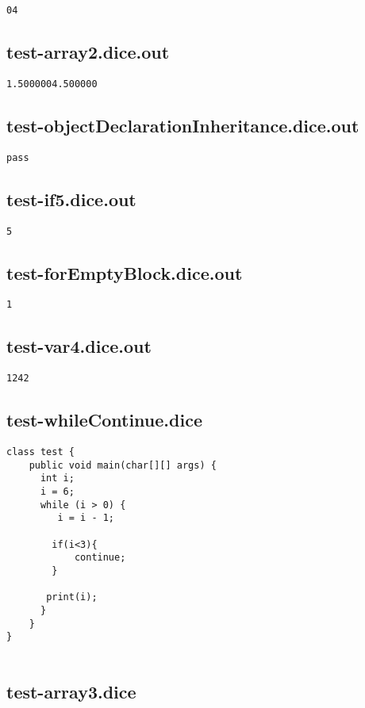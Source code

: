 \begin{verbatim}
04
\end{verbatim}\pagebreak\subsection{test-array2.dice.out}
\begin{verbatim}
1.5000004.500000
\end{verbatim}\pagebreak\subsection{test-objectDeclarationInheritance.dice.out}
\begin{verbatim}
pass
\end{verbatim}\pagebreak\subsection{test-if5.dice.out}
\begin{verbatim}
5
\end{verbatim}\pagebreak\subsection{test-forEmptyBlock.dice.out}
\begin{verbatim}
1
\end{verbatim}\pagebreak\subsection{test-var4.dice.out}
\begin{verbatim}
1242
\end{verbatim}\pagebreak\subsection{test-whileContinue.dice}
\begin{verbatim}
class test {
	public void main(char[][] args) {
	  int i;
	  i = 6;
	  while (i > 0) {
	  	 i = i - 1;
	    
	    if(i<3){
	    	continue;
	    }
	   
	   print(i);
	  }
	}
}


\end{verbatim}\pagebreak\subsection{test-array3.dice}
